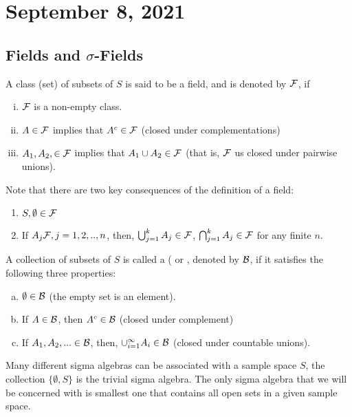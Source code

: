 \section{September 8, 2021}
\subsection{Fields and $\sigma$-Fields}
\begin{definition}
    A class (set) of subsets of $S$ is said to be a field, and is denoted by $\mathcal F$, if 
    \begin{enumerate}[(i)]
        \item $\mathcal F$ is a non-empty class.
        \item $A \in \mathcal F$ implies that $A^c \in \mathcal F$ (closed under complementations)
        \item $A_1, A_2, \in \mathcal F$ implies that $A_1 \cup A_2 \in \mathcal F$ (that is, $\mathcal F$ us closed under pairwise unions).
    \end{enumerate}
\end{definition}
Note that there are two key consequences of the definition of a field:
\begin{enumerate}
    \item $S, \emptyset \in \mathcal F$
    \item If $A_j \mathcal F, j =1,2,..,n$, then, $\bigcup_{j=1}^{k}A_{j} \in \mathcal F$, $\bigcap_{j=1}^{k}A_{j} \in \mathcal F$ for any finite $n$.
\end{enumerate}


\begin{definition}
    A collection of subsets of $S$ is called a  ( or , denoted by $\mathcal B$, if it satisfies the following three properties:
    
    \begin{enumerate}[(a)]
        \item $\emptyset \in \mathcal B$ (the empty set is an element).
        \item If $A \in \mathcal B$, then $A^c \in \mathcal B$ (closed under complement) 
        \item If $A_1, A_2, ... \in \mathcal B$, then, $\cup_{i=1}^{\infty}A_i \in \mathcal B$ (closed under countable unions).
    \end{enumerate}
\end{definition}
Many different sigma algebras can be associated with a sample space $S$, the collection $\{\emptyset, S\}$ is the trivial sigma algebra. The only sigma algebra that we will be concerned with is smallest one that contains all open sets in a given sample space.

